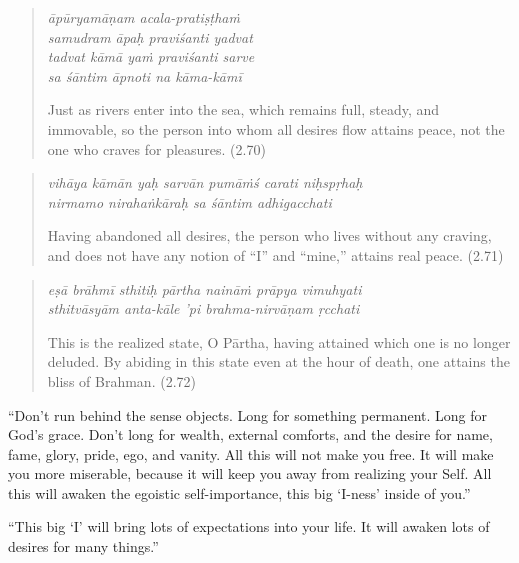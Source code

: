 \documentclass[12pt, twoside, openright]{memoir}
\begin{document}
\par
\begin{verse}
\textit{āpūryamāṇam acala-pratiṣṭhaṁ} \\
\textit{samudram āpaḥ praviśanti yadvat} \\
\textit{tadvat kāmā yaṁ praviśanti sarve} \\
\textit{sa śāntim āpnoti na kāma-kāmī}

\noindent Just as rivers enter into the sea, which remains full, steady, and immovable, so the person into whom all desires flow attains peace, not the one who craves for pleasures. (2.70)
\end{verse}
\par



\par
\begin{verse}
\textit{vihāya kāmān yaḥ sarvān pumāṁś carati niḥspṛhaḥ} \\
\textit{nirmamo nirahaṅkāraḥ sa śāntim adhigacchati}

\noindent Having abandoned all desires, the person who lives without any craving, and does not have any notion of \enquote{I} and \enquote{mine,} attains real peace. (2.71)
\end{verse}
\par



\par
\begin{verse}
\textit{eṣā brāhmī sthitiḥ pārtha naināṁ prāpya vimuhyati} \\
\textit{sthitvāsyām anta-kāle ’pi brahma-nirvāṇam ṛcchati}

\noindent This is the realized state, O Pārtha, having attained which one is no longer deluded. By abiding in this state even at the hour of death, one attains the bliss of Brahman. (2.72)
\end{verse}
\par


\enquote{Don’t run behind the sense objects. Long for something permanent. Long for God’s grace. Don’t long for wealth, external comforts, and the desire for name, fame, glory, pride, ego, and vanity. All this will not make you free. It will make you more miserable, because it will keep you away from realizing your Self. All this will awaken the egoistic self-importance, this big \enquote{I-ness} inside of you.}

\enquote{This big \enquote{I} will bring lots of expectations into your life. It will awaken lots of desires for many things.}
\end{document}
